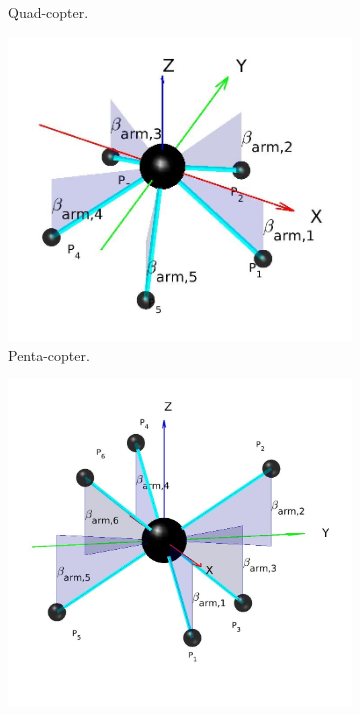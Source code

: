 \begin{figure}[!ht]
\begin{subfigure}[b]{0.5\textwidth}
    \caption{Quad-copter.} \label{fig:comp_quad}
  \end{subfigure}
  \hspace*{\fill} %
  \begin{subfigure}[b]{0.5\textwidth}
    \includegraphics[width=\linewidth]{images/Pentacopter.jpg}
    \caption{Penta-copter.} \label{fig:comp_penta}
  \end{subfigure}
  \hspace*{\fill} %
  \begin{subfigure}[b]{0.5\textwidth}
    \includegraphics[width=\linewidth]{images/Hexacopter.jpg}

\end{subfigure}
\end{figure}
